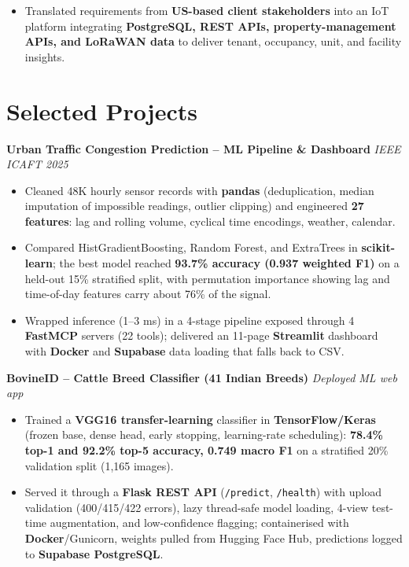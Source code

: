 \documentclass[11pt]{extarticle}
\begin{document}
\begin{itemize}
    \item Translated requirements from \textbf{US-based client stakeholders} into an IoT platform integrating \textbf{PostgreSQL, REST APIs, property-management APIs, and LoRaWAN data} to deliver tenant, occupancy, unit, and facility insights.
\end{itemize}


\section*{Selected Projects}

\textbf{Urban Traffic Congestion Prediction -- ML Pipeline \& Dashboard}
\hfill \textit{IEEE ICAFT 2025}

\begin{itemize}
    \item Cleaned 48K hourly sensor records with \textbf{pandas} (deduplication, median imputation of impossible readings, outlier clipping) and engineered \textbf{27 features}: lag and rolling volume, cyclical time encodings, weather, calendar.
    \item Compared HistGradientBoosting, Random Forest, and ExtraTrees in \textbf{scikit-learn}; the best model reached \textbf{93.7\% accuracy (0.937 weighted F1)} on a held-out 15\% stratified split, with permutation importance showing lag and time-of-day features carry about 76\% of the signal.
    \item Wrapped inference (1--3 ms) in a 4-stage pipeline exposed through 4 \textbf{FastMCP} servers (22 tools); delivered an 11-page \textbf{Streamlit} dashboard with \textbf{Docker} and \textbf{Supabase} data loading that falls back to CSV.
\end{itemize}

\vspace{3pt}

\textbf{BovineID -- Cattle Breed Classifier (41 Indian Breeds)}
\hfill \textit{Deployed ML web app}

\begin{itemize}
    \item Trained a \textbf{VGG16 transfer-learning} classifier in \textbf{TensorFlow/Keras} (frozen base, dense head, early stopping, learning-rate scheduling): \textbf{78.4\% top-1 and 92.2\% top-5 accuracy, 0.749 macro F1} on a stratified 20\% validation split (1,165 images).
    \item Served it through a \textbf{Flask REST API} (\texttt{/predict}, \texttt{/health}) with upload validation (400/415/422 errors), lazy thread-safe model loading, 4-view test-time augmentation, and low-confidence flagging; containerised with \textbf{Docker}/Gunicorn, weights pulled from Hugging Face Hub, predictions logged to \textbf{Supabase PostgreSQL}.
\end{itemize}
\end{document}
